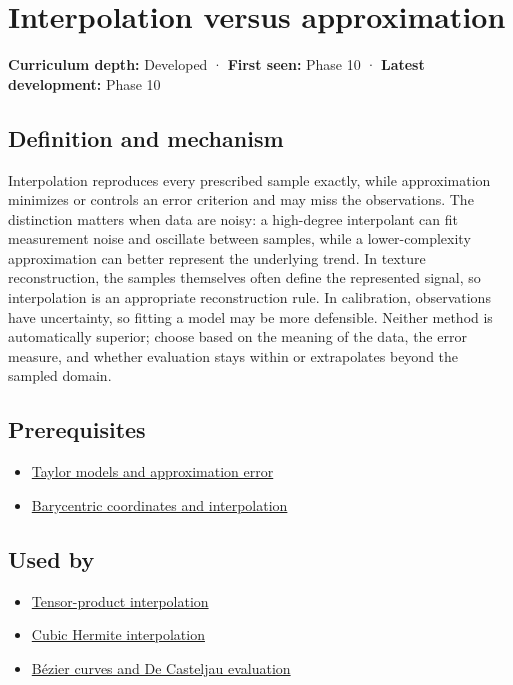 \hypertarget{appendix-0c2a5f69851e}{}
\section{Interpolation versus approximation}\label{appendix-0c2a5f69851e-interpolation-versus-approximation}

\textbf{Curriculum depth:} Developed · \textbf{First seen:} Phase 10 · \textbf{Latest development:} Phase 10

\subsection{Definition and mechanism}\label{appendix-0c2a5f69851e-definition-and-mechanism}

Interpolation reproduces every prescribed sample exactly, while approximation minimizes or controls an error criterion and may miss the observations. The distinction matters when data are noisy: a high-degree interpolant can fit measurement noise and oscillate between samples, while a lower-complexity approximation can better represent the underlying trend. In texture reconstruction, the samples themselves often define the represented signal, so interpolation is an appropriate reconstruction rule. In calibration, observations have uncertainty, so fitting a model may be more defensible. Neither method is automatically superior; choose based on the meaning of the data, the error measure, and whether evaluation stays within or extrapolates beyond the sampled domain.

\subsection{Prerequisites}\label{appendix-0c2a5f69851e-prerequisites}

\begin{itemize}
\tightlist
\item
  \hyperref[appendix-32f39e9a3738]{Taylor models and approximation error}
\item
  \hyperref[appendix-02b9d9a81dca]{Barycentric coordinates and interpolation}
\end{itemize}

\subsection{Used by}\label{appendix-0c2a5f69851e-used-by}

\begin{itemize}
\tightlist
\item
  \hyperref[appendix-0a09b6dfdc86]{Tensor-product interpolation}
\item
  \hyperref[appendix-db3aef8f2fd6]{Cubic Hermite interpolation}
\item
  \hyperref[appendix-ddbec701898c]{Bézier curves and De Casteljau evaluation}
\end{itemize}

